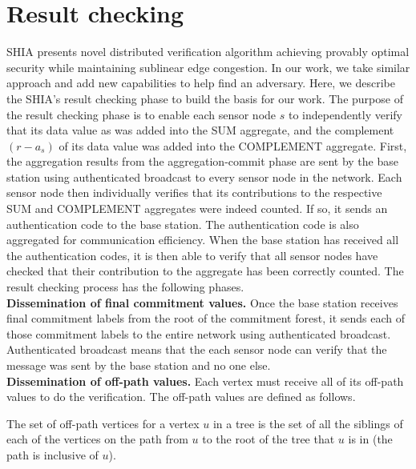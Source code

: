 \section{Result checking} %
	\label{sec:result_checking}
	SHIA presents novel distributed verification algorithm achieving provably optimal security while maintaining sublinear edge congestion.
	In our work, we take similar approach and add new capabilities to help find an adversary.
	Here, we describe the SHIA's result checking phase to build the basis for our work.
	The purpose of the result checking phase is to enable each sensor node $s$ to independently verify that its data value as was added into the SUM aggregate, and the complement $(r - a_{s})$ of its data value was added into the COMPLEMENT aggregate. 
	First, the aggregation results from the aggregation-commit phase are sent by the base station using authenticated broadcast to every sensor node in the network.
	Each sensor node then individually verifies that its contributions to the respective SUM and COMPLEMENT aggregates were indeed counted.
	If so, it sends an authentication code to the base station.
	The authentication code is also aggregated for communication efficiency. 
	When the base station has received all the authentication codes, it is then able to verify that all sensor nodes have checked that their contribution to the aggregate has been correctly counted.
	The result checking process has the following phases.\\
	\textbf{Dissemination of final commitment values.}
	Once the base station receives final commitment labels from the root of the commitment forest, it sends each of those commitment labels to the entire network using authenticated broadcast.
	Authenticated broadcast means that the each sensor node can verify that the message was sent by the base station and no one else.\\
	\textbf{Dissemination of off-path values.} 
	Each vertex must receive all of its off-path values to do the verification.
	The off-path values are defined as follows.
	\begin{definition}
		\label{def:off-path}
		\cite{chan2006secure}
		The set of off-path vertices for a vertex $u$ in a tree is the set of all the siblings of each of the vertices on the path from $u$ to the root of the tree that $u$ is in (the path is inclusive of $u$).
	\end{definition}
